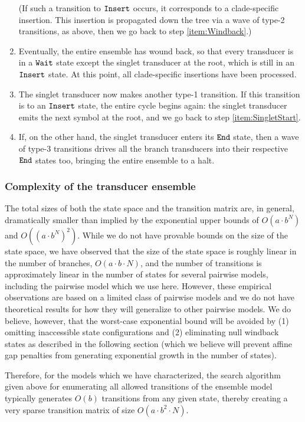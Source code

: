 \documentclass[10pt]{article}
\begin{document}
\begin{enumerate}
  (If such a transition to $\mathtt{Insert}$ occurs, it corresponds to a clade-specific insertion.
  This insertion is propagated down the tree via a wave of type-2 transitions, as above,
  then we go back to step \ref{item:Windback}.)
\item Eventually, the entire ensemble has wound back, so that every transducer is in a $\mathtt{Wait}$ state except the singlet transducer at the root,
  which is still in an $\mathtt{Insert}$ state.
  At this point, all clade-specific insertions have been processed.
\item The singlet transducer now makes another type-1 transition.
  If this transition is to an $\mathtt{Insert}$ state, the entire cycle begins again: the singlet transducer emits the next symbol at the root,
  and we go back to step \ref{item:SingletStart}.
\item If, on the other hand, the singlet transducer enters its $\mathtt{End}$ state,
  then a wave of type-3 transitions drives all the branch transducers into their respective $\mathtt{End}$ states too,
  bringing the entire ensemble to a halt.
\end{enumerate}

\subsubsection*{Complexity of the transducer ensemble}

The total sizes of both the state space and the transition matrix are,
in general, dramatically smaller than implied by the exponential upper
bounds of $O(a \cdot b^N)$ and $O((a \cdot b^N)^2)$.  While we do not
have provable bounds on the size of the state space, we have observed
that the size of the state space is roughly linear in the number of
branches, $O(a \cdot b \cdot N)$, and the number of transitions is
approximately linear in the number of states for several pairwise models,
including the pairwise model which we use here.
However, these empirical observations are based on a
limited class of pairwise models and we do not have theoretical results for
how they will generalize to other pairwise models.  We do believe, however,
that the worst-case exponential bound will be avoided by (1)
omitting inaccessible state configurations and (2) eliminating
null windback states as described in the following section (which we
believe will prevent affine gap penalties from generating exponential
growth in the number of states).

Therefore, for the models which we have characterized, the search
algorithm given above for enumerating all allowed transitions of the
ensemble model typically generates $O(b)$ transitions from any given
state, thereby creating a very sparse transition matrix of size $O(a \cdot b^2 \cdot N)$.
\end{document}
